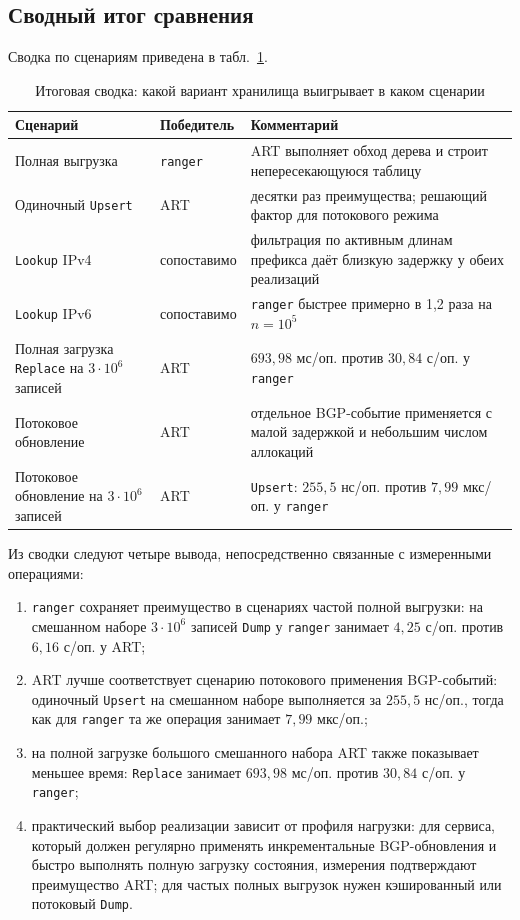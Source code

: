\subsection{Сводный итог сравнения}

Сводка по сценариям приведена в табл.~\ref{tab:bench-summary}.

\begin{table}[ht]
\centering
\caption{Итоговая сводка: какой вариант хранилища выигрывает в каком сценарии}
\label{tab:bench-summary}
\small
\begin{tabular}{>{\raggedright\arraybackslash}p{4.0cm}lp{6.5cm}}
\toprule
Сценарий & Победитель & Комментарий \\
\midrule
Полная выгрузка
  & \texttt{ranger}
  & ART выполняет обход дерева и строит непересекающуюся таблицу \\
Одиночный \texttt{Upsert}
  & ART
  & десятки раз преимущества; решающий фактор для потокового режима \\
\texttt{Lookup} IPv4
  & сопоставимо
  & фильтрация по активным длинам префикса даёт близкую задержку у обеих реализаций \\
\texttt{Lookup} IPv6
  & сопоставимо
  & \texttt{ranger} быстрее примерно в 1{,}2 раза на $n=10^5$ \\
Полная загрузка \texttt{Replace} на $3\cdot10^6$ записей
  & ART
  & $693{,}98$ мс/оп. против $30{,}84$ с/оп. у \texttt{ranger} \\
Потоковое обновление
  & ART
  & отдельное BGP-событие применяется с малой задержкой и небольшим числом аллокаций \\
Потоковое обновление на $3\cdot10^6$ записей
  & ART
  & \texttt{Upsert}: $255{,}5$ нс/оп. против $7{,}99$ мкс/оп. у \texttt{ranger} \\
\bottomrule
\end{tabular}
\end{table}

Из сводки следуют четыре вывода, непосредственно связанные с измеренными
операциями:

\begin{enumerate}
\item \texttt{ranger} сохраняет преимущество в сценариях частой полной
выгрузки: на смешанном наборе $3\cdot10^6$ записей \texttt{Dump} у
\texttt{ranger} занимает $4{,}25$ с/оп. против $6{,}16$ с/оп. у ART;
\item ART лучше соответствует сценарию потокового применения BGP-событий:
одиночный \texttt{Upsert} на смешанном наборе выполняется за
$255{,}5$ нс/оп., тогда как для \texttt{ranger} та же операция занимает
$7{,}99$ мкс/оп.;
\item на полной загрузке большого смешанного набора ART также показывает
меньшее время: \texttt{Replace} занимает $693{,}98$ мс/оп. против
$30{,}84$ с/оп. у \texttt{ranger};
\item практический выбор реализации зависит от профиля нагрузки: для
сервиса, который должен регулярно применять инкрементальные BGP-обновления
и быстро выполнять полную загрузку состояния, измерения подтверждают
преимущество ART; для частых полных выгрузок нужен кэшированный или
потоковый \texttt{Dump}.
\end{enumerate}

